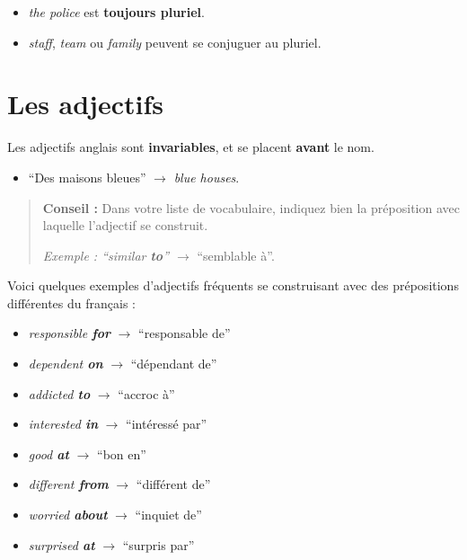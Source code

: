 \documentclass[
  10pt,
]{article}
\providecommand{\tightlist}{%
  \setlength{\itemsep}{0pt}\setlength{\parskip}{0pt}}
\begin{document}
\begin{itemize}
\tightlist
\item
  \color[HTML]{f44336}\emph{the police} \color{black} est \textbf{toujours pluriel}.
\item
  \emph{staff}, \emph{team} ou \emph{family} peuvent se conjuguer au pluriel.
\end{itemize}

\hypertarget{les-adjectifs}{%
\section{Les adjectifs}\label{les-adjectifs}}

Les adjectifs anglais sont \textbf{invariables}, et se placent \textbf{avant} le nom.

\begin{itemize}
\tightlist
\item
  ``Des maisons bleues'' \(\rightarrow\) \emph{blue houses}.
\end{itemize}

\begin{quote}
\textbf{Conseil :} Dans votre liste de vocabulaire, indiquez bien la préposition avec laquelle l'adjectif se construit.

\emph{Exemple : ``similar \textbf{to}'' \(\rightarrow\)} ``semblable à''.
\end{quote}

Voici quelques exemples d'adjectifs fréquents se construisant avec des prépositions différentes du français :

\begin{itemize}
\tightlist
\item
  \emph{responsible \textbf{for}} \(\rightarrow\) ``responsable de''
\item
  \emph{dependent \textbf{on}} \(\rightarrow\) ``dépendant de''
\item
  \emph{addicted \textbf{to}} \(\rightarrow\) ``accroc à''
\item
  \emph{interested \textbf{in}} \(\rightarrow\) ``intéressé par''
\item
  \emph{good \textbf{at}} \(\rightarrow\) ``bon en''
\item
  \emph{different \textbf{from}} \(\rightarrow\) ``différent de''
\item
  \emph{worried \textbf{about}} \(\rightarrow\) ``inquiet de''
\item
  \emph{surprised \textbf{at}} \(\rightarrow\) ``surpris par''
\end{itemize}
\end{document}
